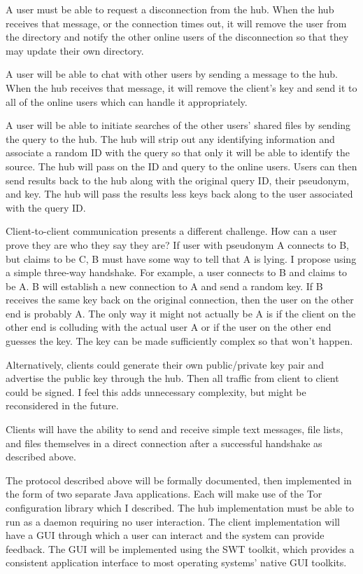 \documentclass{article}
\begin{document}
A user must be able to request a disconnection from the hub.  When the hub receives that message, or the connection times out, it will remove the user from the directory and notify the other online users of the disconnection so that they may update their own directory.

A user will be able to chat with other users by sending a message to the hub.  When the hub receives that message, it will remove the client's key and send it to all of the online users which can handle it appropriately.

A user will be able to initiate searches of the other users' shared files by sending the query to the hub.  The hub will strip out any identifying information and associate a random ID with the query so that only it will be able to identify the source.  The hub will pass on the ID and query to the online users.  Users can then send results back to the hub along with the original query ID, their pseudonym, and key.  The hub will pass the results less keys back along to the user associated with the query ID.

Client-to-client communication presents a different challenge.  How can a user prove they are who they say they are?  If user with pseudonym A connects to B, but claims to be C, B must have some way to tell that A is lying.  I propose using a simple three-way handshake.  For example, a user connects to B and claims to be A.  B will establish a new connection to A and send a random key.  If B receives the same key back on the original connection, then the user on the other end is probably A.  The only way it might not actually be A is if the client on the other end is colluding with the actual user A or if the user on the other end guesses the key.  The key can be made sufficiently complex so that won't happen.

Alternatively, clients could generate their own public/private key pair and advertise the public key through the hub.  Then all traffic from client to client could be signed.  I feel this adds unnecessary complexity, but might be reconsidered in the future.

Clients will have the ability to send and receive simple text messages, file lists, and files themselves in a direct connection after a successful handshake as described above.

The protocol described above will be formally documented, then implemented in the form of two separate Java applications.  Each will make use of the Tor configuration library which I described.  The hub implementation must be able to run as a daemon requiring no user interaction.  The client implementation will have a GUI through which a user can interact and the system can provide feedback.  The GUI will be implemented using the SWT toolkit, which provides a consistent application interface to most operating systems' native GUI toolkits.
\end{document}
